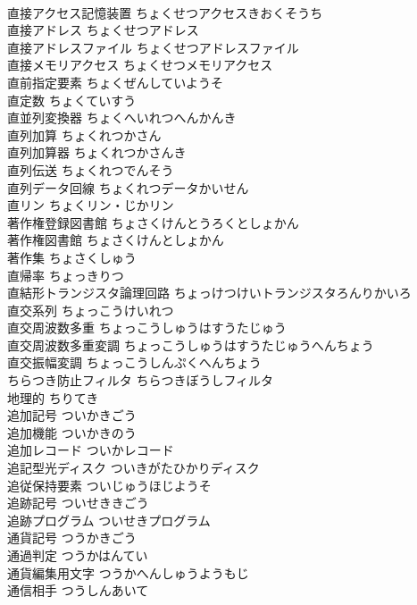 \documentclass[8pt]{extreport}
\begin{document}
\begin{CJK}{UTF8}{min}
\\	直接アクセス記憶装置	ちょくせつアクセスきおくそうち	
\\	直接アドレス	ちょくせつアドレス	
\\	直接アドレスファイル	ちょくせつアドレスファイル	
\\	直接メモリアクセス	ちょくせつメモリアクセス	
\\	直前指定要素	ちょくぜんしていようそ	
\\	直定数	ちょくていすう	
\\	直並列変換器	ちょくへいれつへんかんき	
\\	直列加算	ちょくれつかさん	
\\	直列加算器	ちょくれつかさんき	
\\	直列伝送	ちょくれつでんそう	
\\	直列データ回線	ちょくれつデータかいせん	
\\	直リン	ちょくリン・じかリン	
\\	著作権登録図書館	ちょさくけんとうろくとしょかん	
\\	著作権図書館	ちょさくけんとしょかん	
\\	著作集	ちょさくしゅう	
\\	直帰率	ちょっきりつ	
\\	直結形トランジスタ論理回路	ちょっけつけいトランジスタろんりかいろ	
\\	直交系列	ちょっこうけいれつ	
\\	直交周波数多重	ちょっこうしゅうはすうたじゅう	
\\	直交周波数多重変調	ちょっこうしゅうはすうたじゅうへんちょう	
\\	直交振幅変調	ちょっこうしんぷくへんちょう	
\\	ちらつき防止フィルタ	ちらつきぼうしフィルタ	
\\	地理的	ちりてき	
\\	追加記号	ついかきごう	
\\	追加機能	ついかきのう	
\\	追加レコード	ついかレコード	
\\	追記型光ディスク	ついきがたひかりディスク	
\\	追従保持要素	ついじゅうほじようそ	
\\	追跡記号	ついせききごう	
\\	追跡プログラム	ついせきプログラム	
\\	通貨記号	つうかきごう	
\\	通過判定	つうかはんてい	
\\	通貨編集用文字	つうかへんしゅうようもじ	
\\	通信相手	つうしんあいて	

\end{CJK}
\end{document}
